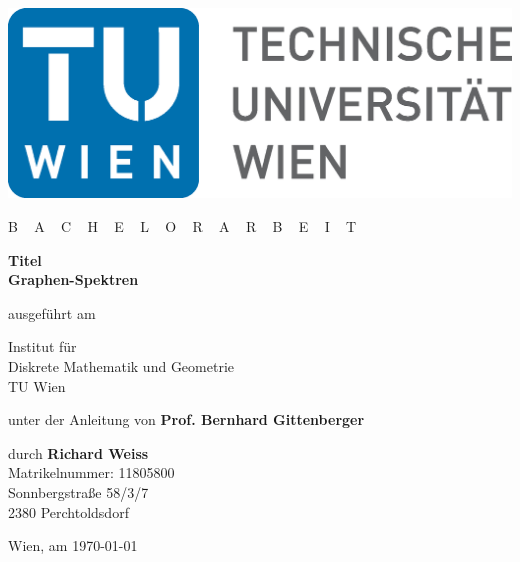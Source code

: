 
\begin{titlepage}

    \begin{center}

        \includegraphics[width = 0.45 \textwidth]{TULogo.eps}

        \vskip 1cm

        {\LARGE B ~ \Large A ~ C ~ H ~ E ~ L ~ O ~ R ~ A ~ R ~ B ~ E ~ I ~ T}

        \vskip 8mm

        {\huge \bfseries Titel \\ [1ex] Graphen-Spektren}

        \vskip 1cm

        \large  ausgeführt am        

        \vskip 0.75cm

        {\Large Institut für \\ [1ex] Diskrete Mathematik und Geometrie} \\ [1ex]
        {\Large TU Wien}

        \vskip 0.75cm

        unter der Anleitung von
        \vskip 0.75cm
        {\Large \bfseries Prof. Bernhard Gittenberger} \\ [1ex]

        \vskip 0.5cm

        durch
        \vskip 0.5cm
        {\Large \bfseries  Richard Weiss} \\ [1ex]

        Matrikelnummer: 11805800 \\ [1ex]
        Sonnbergstraße 58/3/7 \\ [1ex]
        2380 Perchtoldsdorf

    \end{center}
    
    \vfill
    
    \small
    Wien, am \today
    \vspace*{-15mm}

\end{titlepage}

\cleardoublepage